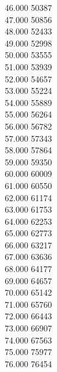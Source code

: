 { 46.000	50387 \\
 47.000	50856 \\
 48.000	52433 \\
 49.000	52998 \\
 50.000	53555 \\
 51.000	53939 \\
 52.000	54657 \\
 53.000	55224 \\
 54.000	55889 \\
 55.000	56264 \\
 56.000	56782 \\
 57.000	57343 \\
 58.000	57864 \\
 59.000	59350 \\
 60.000	60009 \\
 61.000	60550 \\
 62.000	61174 \\
 63.000	61753 \\
 64.000	62253 \\
 65.000	62773 \\
 66.000	63217 \\
 67.000	63636 \\
 68.000	64177 \\
 69.000	64657 \\
 70.000	65142 \\
 71.000	65760 \\
 72.000	66443 \\
 73.000	66907 \\
 74.000	67563 \\
 75.000	75977 \\
 76.000	76454 \\
}
